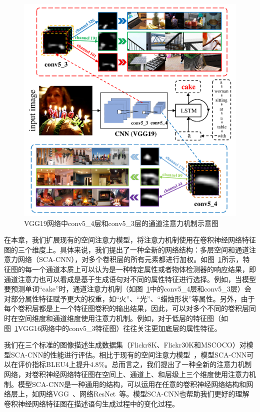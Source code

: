 \begin{figure}[t]
    \centering
    \includegraphics[width=0.9\linewidth]{chapter5/res/motivation.pdf}
    \caption{VGG19网络中conv5\_4层和conv5\_3层的通道注意力机制示意图}
    \label{ch5:fig:motivation}
\end{figure}

在本章，我们扩展现有的空间注意力模型，将注意力机制使用在卷积神经网络特征图的三个维度上。具体来说，我们提出了一种全新的网络结构：多层空间和通道注意力网络（SCA-CNN），对多个卷积层的所有元素都进行加权。如图~\ref{ch5:fig:motivation}所示，特征图的每一个通道本质上可以认为是一种特定属性或者物体检测器的响应结果，即通道注意力也可以看成是基于生成语句对不同的属性特征进行选择。例如，当模型要预测单词“cake”时，通道注意力机制（如图~\ref{ch5:fig:motivation}中的conv5\_4层和conv5\_3层）会对部分属性特征赋予更大的权重，如“火”、“光”、“蜡烛形状”等属性。另外，由于每个卷积层都是上一个特征图卷积的输出结果，因此，可以对多个不同的卷积层同时在空间维度和通道维度使用注意力机制。例如，对于低层的特征图（如图~\ref{ch5:fig:motivation}VGG16网络中的conv5\_3特征图）往往关注更加底层的属性特征。

我们在三个标准的图像描述生成数据集（Flickr8K、Flickr30K和MSCOCO）对模型SCA-CNN的性能进行评估。相比于现有的空间注意力模型~\cite{xu2015show}，模型SCA-CNN可以在评价指标BLEU4上提升4.8\%。总而言之，我们提出了一种全新的注意力机制网络，对卷积神经网络特征图在空间上、通道上、和层级上三个维度使用注意力机制。模型SCA-CNN是一种通用的结构，可以运用在任意的卷积神经网络结构和网络层上，如网络VGG~\cite{simonyan2015very}、网络ResNet~\cite{he2016deep}等。模型SCA-CNN也帮助我们更好的理解卷积神经网络特征图在描述语句生成过程中的变化过程。


